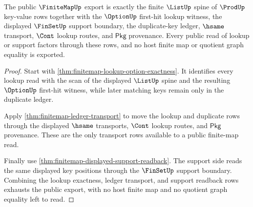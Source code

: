 \begin{theorem}
\label{thm:finitemap-public-support-lookup-boundary}
The public $\FiniteMapUp$ export is exactly the finite $\ListUp$ spine of
$\ProdUp$ key-value rows together with the $\OptionUp$ first-hit lookup
witness, the displayed $\FinSetUp$ support boundary, the duplicate-key ledger,
$\hsame$ transport, $\Cont$ lookup routes, and $\mathsf{Pkg}$ provenance. Every
public read of lookup or support factors through these rows, and no host finite
map or quotient graph equality is exported.
\end{theorem}
\begin{proof}
Start with \autoref{thm:finitemap-lookup-option-exactness}. It identifies every
lookup read with the scan of the displayed $\ListUp$ spine and the resulting
$\OptionUp$ first-hit witness, while later matching keys remain only in the
duplicate ledger.

Apply \autoref{thm:finitemap-ledger-transport} to move the lookup and duplicate
rows through the displayed $\hsame$ transports, $\Cont$ lookup routes, and
$\mathsf{Pkg}$ provenance. These are the only transport rows available to a
public finite-map read.

Finally use \autoref{thm:finitemap-displayed-support-readback}. The support
side reads the same displayed key positions through the $\FinSetUp$ support
boundary. Combining the lookup exactness, ledger transport, and support
readback rows exhausts the public export, with no host finite map and no
quotient graph equality left to read.
\end{proof}

